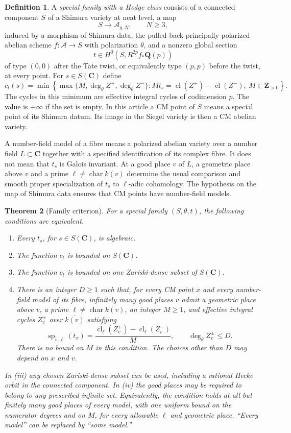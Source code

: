 \documentclass[11pt]{article}
\newtheorem{theorem}{Theorem}[section]
\theoremstyle{definition}
\newtheorem{definition}[theorem]{Definition}
\theoremstyle{remark}
\newcommand{\Q}{\mathbf Q}
\newcommand{\Z}{\mathbf Z}
\newcommand{\C}{\mathbf C}
\newcommand{\A}{\mathcal A}
\newcommand{\cl}{\operatorname{cl}}
\begin{document}
\begin{definition}\label{def:special}
A \emph{special family with a Hodge class} consists of a connected component $S$ of a Shimura variety at neat level, a map
\[
 S\longrightarrow\mathcal A_{g,N},\qquad N\geq3,
\]
induced by a morphism of Shimura data, the pulled-back principally polarized abelian scheme $f:\A\to S$ with polarization $\theta$, and a nonzero global section
\[
 t\in H^0(S,R^{2p}f_*\Q(p))
\]
of type $(0,0)$ after the Tate twist, or equivalently type $(p,p)$ before the twist, at every point. For $s\in S(\C)$ define
\[
 c_t(s)=\min\left\{\max\{M,\deg_\theta Z^+,\deg_\theta Z^-\}:
 M t_s=\cl(Z^+)-\cl(Z^-),\ M\in\Z_{>0}\right\}.
\]
The cycles in this minimum are effective integral cycles of codimension $p$. The value is $+\infty$ if the set is empty. In this article a CM point of $S$ means a special point of its Shimura datum. Its image in the Siegel variety is then a CM abelian variety.
\end{definition}

A number-field model of a fibre means a polarized abelian variety over a number field $L\subset\C$ together with a specified identification of its complex fibre. It does not mean that $t_s$ is Galois invariant. At a good place $v$ of $L$, a geometric place above $v$ and a prime $\ell\ne\operatorname{char}k(v)$ determine the usual comparison and smooth proper specialization of $t_s$ to $\ell$-adic cohomology. The hypothesis on the map of Shimura data ensures that CM points have number-field models.

\begin{theorem}[Family criterion]\label{thm:family}
For a special family $(S,\theta,t)$, the following conditions are equivalent.
\begin{enumerate}[label=\textnormal{(\roman*)}]
\item Every $t_s$, for $s\in S(\C)$, is algebraic.
\item The function $c_t$ is bounded on $S(\C)$.
\item The function $c_t$ is bounded on one Zariski-dense subset of $S(\C)$.
\item There is an integer $D\geq1$ such that, for every CM point $x$ and every number-field model of its fibre, infinitely many good places $v$ admit a geometric place above $v$, a prime $\ell\ne\operatorname{char}k(v)$, an integer $M\geq1$, and effective integral cycles $Z_v^\pm$ over $\overline{k(v)}$ satisfying
\[
 \operatorname{sp}_{v,\ell}(t_x)
 =\frac{\cl_\ell(Z_v^+)-\cl_\ell(Z_v^-)}{M},
 \qquad \deg_\theta Z_v^\pm\leq D.
\]
There is no bound on $M$ in this condition. The choices other than $D$ may depend on $x$ and $v$.
\end{enumerate}
In \textnormal{(iii)} any chosen Zariski-dense subset can be used, including a rational Hecke orbit in the connected component. In \textnormal{(iv)} the good places may be required to belong to any prescribed infinite set. Equivalently, the condition holds at all but finitely many good places of every model, with one uniform bound on the numerator degrees and on $M$, for every allowable $\ell$ and geometric place. ``Every model'' can be replaced by ``some model.''
\end{theorem}
\end{document}
